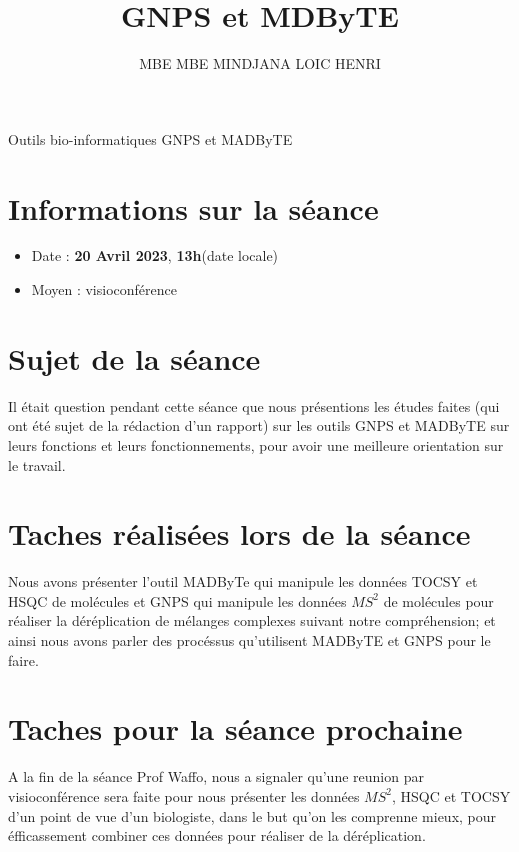 \documentclass[12pt, french, latin.medieval, a4paper]{report}
\author{MBE MBE MINDJANA LOIC HENRI}
\title{GNPS et MDByTE}
\begin{document}
    
    \pagecouverture
    {Outils bio-informatiques GNPS et MADByTE}
    {}
    \tableofcontents
    \vspace{20cm}

    \section{Informations sur la séance}
    \begin{itemize}
        \item Date : \textbf{20 Avril 2023}, \textbf{13h}(date locale)
        \item Moyen : visioconférence
    \end{itemize}
    
    \section{Sujet de la séance}
    Il était question pendant cette séance que nous présentions les études faites (qui ont été sujet de la rédaction d'un rapport) sur les outils GNPS et MADByTE sur leurs fonctions et leurs fonctionnements, pour avoir une meilleure orientation sur le travail.
    
    \section{Taches réalisées lors de la séance}
    Nous avons présenter l'outil MADByTe qui manipule les données TOCSY et HSQC de molécules et GNPS qui manipule les données $MS^{2}$ de molécules pour réaliser la déréplication de mélanges complexes suivant notre compréhension; et ainsi nous avons parler des procéssus qu'utilisent MADByTE et GNPS pour le faire. 
    
    \section{Taches pour la séance prochaine}
    A la fin de la séance Prof Waffo, nous a signaler qu'une reunion par visioconférence sera faite pour nous présenter les données $MS^{2}$, HSQC et TOCSY d'un point de vue d'un biologiste, dans le but qu'on les comprenne mieux, pour éfficassement combiner ces données pour réaliser de la déréplication.
\end{document}
